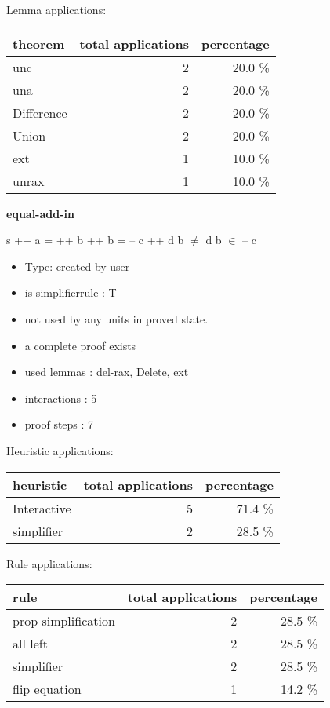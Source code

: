 \documentclass[a4paper]{article}
\begin{document}
Lemma applications:

\begin{supertabular}{l|r|r}
theorem	        & total applications & percentage \\ \hline
unc & 2 & 20.0 \% \\
una & 2 & 20.0 \% \\
Difference & 2 & 20.0 \% \\
Union & 2 & 20.0 \% \\
ext & 1 & 10.0 \% \\
unrax & 1 & 10.0 \% \\

\end{supertabular}
\pagebreak

{\LARGE\bf equal-add-in}\label{lemma-equal-add-in}

\medskip

 \Fol s ++ a =  ++ b \And {} ++ b =  -- c ++ d \And b $\neq$ d \Imp b $\in$  -- c

\begin{itemize}

\item Type: created by user

\item is simplifierrule : T
\item not used by any units in proved state.
\item       a complete proof exists
\item       used lemmas  : del-rax, Delete, ext
\item       interactions : 5
\item       proof steps  : 7
\end{itemize}

\medskip


Heuristic applications:

\begin{supertabular}{l|r|r}
heuristic	& total applications & percentage \\ \hline
Interactive & 5 & 71.4 \% \\
simplifier & 2 & 28.5 \% \\

\end{supertabular}

Rule applications:

\begin{supertabular}{l|r|r}
rule	        & total applications & percentage \\ \hline
prop simplification & 2 & 28.5 \% \\
all left & 2 & 28.5 \% \\
simplifier & 2 & 28.5 \% \\
flip equation & 1 & 14.2 \% \\

\end{supertabular}
\end{document}
